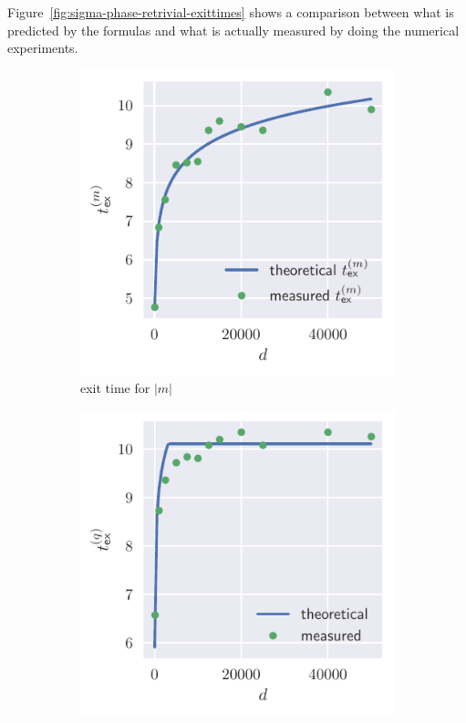 Figure~\ref{fig:sigma-phase-retrivial-exittimes} shows a comparison between what is predicted by the formulas
and what is actually measured by doing the numerical experiments.
\begin{figure}
  \centering
  \begin{subfigure}{0.495\textwidth}
    \includegraphics[width=1.\textwidth]{figures/sigma-phase-retrivial-mexit.pdf}
    \caption{exit time for \(|m|\)}
  \end{subfigure}
  \begin{subfigure}{0.495\textwidth}
    \includegraphics[width=1.\textwidth]{figures/sigma-phase-retrivial-qexit.pdf}

\end{subfigure}
\end{figure}
